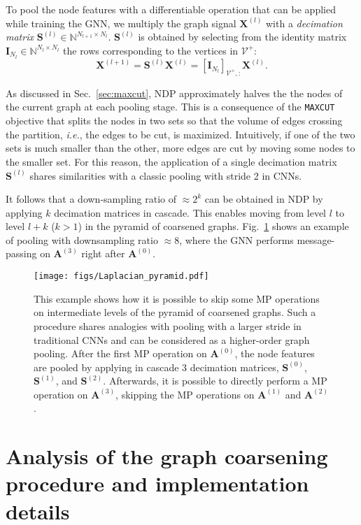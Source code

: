 \documentclass[journal]{IEEEtran}
\def\X{{\mathbf X}}
\def\A{{\mathbf A}}
\def\S{{\mathbf S}}
\def\I{{\mathbf I}}
\newcommand{\maxcut}{\texttt{\small{MAXCUT}}}
\begin{document}
To pool the node features with a differentiable operation that can be applied while training the GNN, we multiply the graph signal $\X^{(l)}$ with a \textit{decimation matrix} $\mathbf{S}^{(l)} \in \mathbb{N}^{N_{l+1} \times N_l}$.
$\mathbf{S}^{(l)}$ is obtained by selecting from the identity matrix $\I_{N_l} \in \mathbb{N}^{N_l \times N_l}$ the rows corresponding to the vertices in $\mathcal{V}^{+}$:
\begin{equation}
    \label{eq:dec_matr}
    \X^{(l+1)} = \mathbf{S}^{(l)} \X^{(l)} = \left[ \I_{N_l} \right]_{\mathcal{V}^{+},:}\X^{(l)}.
\end{equation}

As discussed in Sec.~\ref{sec:maxcut}, NDP approximately halves the the nodes of the current graph at each pooling stage.
This is a consequence of the \maxcut{} objective that splits the nodes in two sets so that the volume of edges crossing the partition, \textit{i.e.}, the edges to be cut, is maximized.
Intuitively, if one of the two sets is much smaller than the other, more edges are cut by moving some nodes to the smaller set.
For this reason, the application of a single decimation matrix $\mathbf{S}^{(l)}$ shares similarities with a classic pooling with stride 2 in CNNs.

It follows that a down-sampling ratio of $\approx2^k$ can be obtained in NDP by applying $k$ decimation matrices in cascade.
This enables moving from level $l$ to level $l+k$ ($k > 1$) in the pyramid of coarsened graphs.
Fig.~\ref{fig:lap_pyramid} shows an example of pooling with downsampling ratio $\approx8$, where the GNN performs message-passing on $\A^{(3)}$ right after $\A^{(0)}$.
\begin{figure}[!ht]
    \centering
    \texttt{[image: figs/Laplacian\_pyramid.pdf]}    
    \caption{This example shows how it is possible to skip some MP operations on intermediate levels of the pyramid of coarsened graphs. 
    Such a procedure shares analogies with pooling with a larger stride in traditional CNNs and can be considered as a higher-order graph pooling.
    After the first MP operation on $\A^{(0)}$, the node features are pooled by applying in cascade 3 decimation matrices, $\S^{(0)}$, $\S^{(1)}$, and $\S^{(2)}$.
    Afterwards, it is possible to directly perform a MP operation on $\A^{(3)}$, skipping the MP operations on $\A^{(1)}$ and $\A^{(2)}$.}
    \label{fig:lap_pyramid}
\end{figure}

\section{Analysis of the graph coarsening procedure and implementation details}
\label{sec:analysis}
\end{document}
